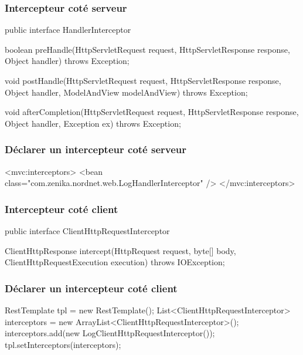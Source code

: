 \begin{frame}[fragile]
 \frametitle{Intercepteur coté serveur} 
 
 \begin{javacode}
public interface HandlerInterceptor {
  
  boolean preHandle(HttpServletRequest request, 
                    HttpServletResponse response, 
                    Object handler) throws Exception;

  void postHandle(HttpServletRequest request, 
                  HttpServletResponse response, 
                  Object handler, ModelAndView modelAndView)
             throws Exception;
  
  void afterCompletion(HttpServletRequest request, 
                       HttpServletResponse response, 
                       Object handler, Exception ex)
             throws Exception;

}
 \end{javacode}

\end{frame} 

\begin{frame}[fragile]
 \frametitle{Déclarer un intercepteur coté serveur} 
 
 \begin{xmlcode}
<mvc:interceptors>
  <bean class="com.zenika.nordnet.web.LogHandlerInterceptor" />
</mvc:interceptors>
 \end{xmlcode}

\end{frame} 

\begin{frame}[fragile]
 \frametitle{Intercepteur coté client} 
 
 \begin{javacode}
public interface ClientHttpRequestInterceptor {

  ClientHttpResponse intercept(HttpRequest request, byte[] body, 
                               ClientHttpRequestExecution execution)
                       throws IOException;

}
 \end{javacode}

\end{frame} 

\begin{frame}[fragile]
 \frametitle{Déclarer un intercepteur coté client} 
 
 \begin{javacode}
RestTemplate tpl = new RestTemplate();
List<ClientHttpRequestInterceptor> interceptors = 
  new ArrayList<ClientHttpRequestInterceptor>();
interceptors.add(new LogClientHttpRequestInterceptor());
tpl.setInterceptors(interceptors);
 \end{javacode}

\end{frame} 